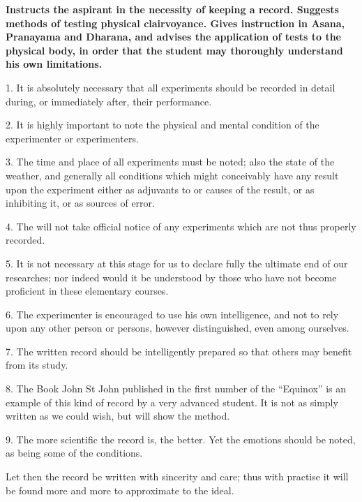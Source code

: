 \textbf{Instructs the aspirant in the necessity of keeping a record. Suggests methods of testing physical clairvoyance. Gives instruction in Asana, Pranayama and Dharana, and advises the application of tests to the physical body, in order that the student may thoroughly understand his own limitations.}



1. It is absolutely necessary that all experiments should be recorded in detail during, or immediately after, their performance.

2. It is highly important to note the physical and mental condition of the experimenter or experimenters.

3. The time and place of all experiments must be noted; also the state of the weather, and generally all conditions which might conceivably have any result upon the experiment either as adjuvants to or causes of the result, or as inhibiting it, or as sources of error.

4. The \Argentium{} will not take official notice of any experiments which are not thus properly recorded.

5. It is not necessary at this stage for us to declare fully the ultimate end of our researches; nor indeed would it be understood by those who have not become proficient in these elementary courses.

6. The experimenter is encouraged to use his own intelligence, and not to rely upon any other person or persons, however distinguished, even among ourselves.

7. The written record should be intelligently prepared so that others may benefit from its study.

8. The Book John St John published in the first number of the \enquote{Equinox} is an example of this kind of record by a very advanced student. It is not as simply written as we could wish, but will show the method.

9. The more scientific the record is, the better. Yet the emotions should be noted, as being some of the conditions.

Let then the record be written with sincerity and care; thus with practise it will be found more and more to approximate to the ideal.



